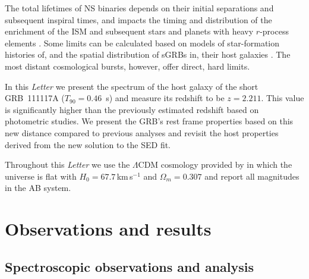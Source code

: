\documentclass{aa}    %
\begin{document}

The total lifetimes of NS binaries depends on their initial separations and
subsequent inspiral times, and impacts the timing and distribution of the
enrichment of the ISM and subsequent stars and planets with heavy $r$-process
elements \citep{VandeVoort2015, Wallner2015,  Ji2016}. Some limits can be
calculated based on models of star-formation histories of, and the spatial
distribution of sGRBs in, their host galaxies \citep[][]{Berger2014}. The most
distant cosmological bursts, however, offer direct, hard limits.


In this \emph{Letter} we present the spectrum of the host galaxy of the short GRB~111117A ($T_{90}=0.46$~s) and measure its redshift to be $z=2.211$. This value is significantly higher 
than the previously estimated redshift based on photometric studies. 
We present the GRB's rest frame 
properties based on this new distance compared to previous analyses
\citep{Margutti2012,Sakamoto2013} and revisit the host properties derived from
the new solution to the SED fit. %

Throughout this \emph{Letter} we use the $\Lambda$CDM cosmology provided by
\citet{Planck2015} in which the universe is flat with $H_0 = 67.7$\,km\,s$^{-1}$
and $\Omega_m = 0.307$ and report all magnitudes in the AB system.


\section{Observations and results}

\subsection{Spectroscopic observations and analysis}
\end{document}
